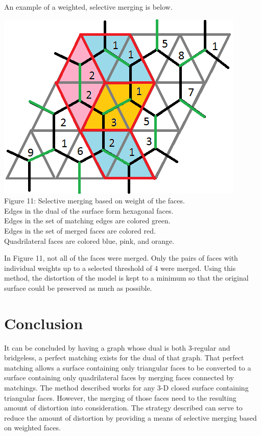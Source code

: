 \documentclass[12pt]{article}
\begin{document}
\begin{flushleft}
\newpage
\medskip
An example of a weighted, selective merging is below.

\begin{center}
\includegraphics[scale=1]{images/weightedmerging.png}\\
Figure 11: Selective merging based on weight of the faces.\\
Edges in the dual of the surface form hexagonal faces.\\
Edges in the set of matching edges are colored green.\\
Edges in the set of merged faces are colored red.\\
Quadrilateral faces are colored blue, pink, and orange.
\end{center}

\medskip
In Figure 11, not all of the faces were merged. Only the pairs of faces with individual weights up to a selected threshold of 4 were merged. Using this method, the distortion of the model is kept to a minimum so that the original surface could be preserved as much as possible.

\section*{Conclusion}
It can be concluded by having a graph whose dual is both 3-regular and bridgeless, a perfect matching exists for the dual of that graph. That perfect matching allows a surface containing only triangular faces to be converted to a surface containing only quadrilateral faces by merging faces connected by matchings. The method described works for any 3-D closed surface containing triangular faces. However, the merging of those faces need to the resulting amount of distortion into consideration. The strategy described can serve to reduce the amount of distortion by providing a means of selective merging based on weighted faces.

\end{flushleft}
\end{document}

